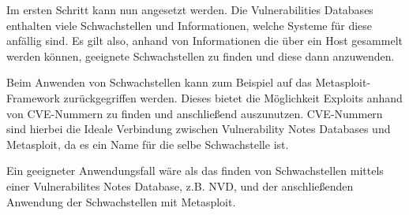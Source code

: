 Im ersten Schritt kann nun angesetzt werden. Die Vulnerabilities
Databases enthalten viele Schwachstellen und Informationen, welche
Systeme für diese anfällig sind.  Es gilt also, anhand von
Informationen die über ein Host gesammelt werden können, geeignete
Schwachstellen zu finden und diese dann anzuwenden.

Beim Anwenden von Schwachstellen kann zum Beispiel auf das
Metasploit-Framework zurückgegriffen werden. Dieses bietet die
Möglichkeit Exploits anhand von CVE-Nummern zu finden und anschließend
auszunutzen. CVE-Nummern sind hierbei die Ideale Verbindung zwischen
Vulnerability Notes Databases und Metasploit, da es ein Name für die
selbe Schwachstelle ist.

Ein geeigneter Anwendungsfall wäre als das finden von Schwachstellen
mittels einer Vulnerabilites Notes Database, z.B. NVD, und der
anschließenden Anwendung der Schwachstellen mit Metasploit.

 


